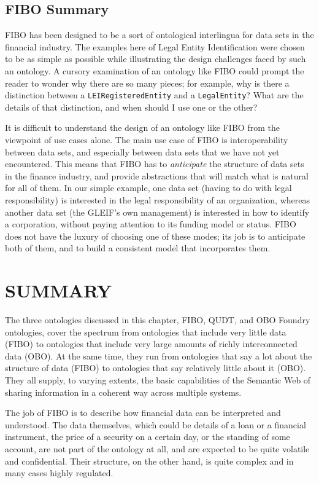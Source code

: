\subsection{FIBO Summary}

FIBO has been designed to be a sort of ontological interlingua for 
data sets in the financial industry.  The examples here of Legal 
Entity Identification were chosen to be as simple as possible 
while illustrating the design challenges faced by such an ontology. 
A cursory examination of an ontology like FIBO could prompt 
the reader to wonder why there are so many pieces; for example, 
why is there 
a distinction between a \texttt{LEIRegisteredEntity} and a
\texttt{LegalEntity}?  What are the details of that distinction, and when
should 
I use one or the other? 

It is difficult to understand the design of an ontology like FIBO from the
viewpoint of use cases alone.  The main use case of FIBO is interoperability 
between data sets, and especially between data sets that we have not yet
encountered.  This means that FIBO has to \emph{anticipate} the structure of 
data sets in the finance industry, and provide abstractions that will match what
is natural for all of them.  In our simple example, one data
set (having to do with legal responsibility) is interested in the legal responsibility 
of an organization,
whereas another data set (the GLEIF's own management) is interested in how to
identify a corporation, without paying attention to its funding model
or status.  FIBO does not have the luxury of choosing one of these modes; its
job is to anticipate both of them, and to build a consistent 
model that incorporates them.


\section{SUMMARY}

The three ontologies discussed in this chapter, FIBO, QUDT,
and OBO Foundry ontologies, cover the spectrum from ontologies that
include very little data (FIBO) to ontologies that
include very large amounts of richly interconnected data (OBO). 
At the same time, they run from ontologies that say a lot about the 
structure of data (FIBO) to ontologies that say relatively little about 
it (OBO). 
They all
supply, to varying extents, the basic capabilities of the Semantic Web
of sharing information in a coherent way across multiple systems.

The job of FIBO is to describe how financial data can be interpreted and 
understood.  The data themselves, which could be details of a loan or a 
financial instrument, the price of a security on a certain day, 
or the standing of some account, are not part of the ontology at all, 
and are expected to be quite volatile and confidential.  Their structure, 
on the other hand, is quite complex and in many cases highly regulated. 

